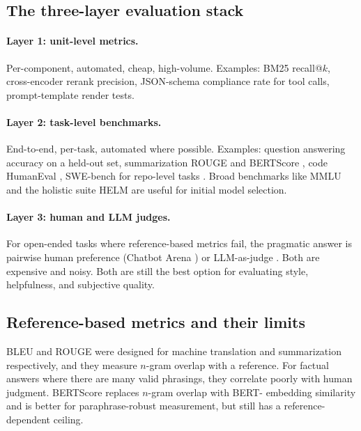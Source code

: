 \subsection{The three-layer evaluation stack}

\paragraph{Layer 1: unit-level metrics.} Per-component, automated,
cheap, high-volume. Examples: BM25 recall@$k$, cross-encoder
rerank precision, JSON-schema compliance rate for tool calls,
prompt-template render tests.

\paragraph{Layer 2: task-level benchmarks.} End-to-end, per-task,
automated where possible. Examples: question answering accuracy
on a held-out set, summarization ROUGE \citep{lin2004rouge} and
BERTScore \citep{zhang2020bertscore}, code HumanEval
\citep{chen2021humaneval}, SWE-bench for repo-level tasks
\citep{jimenez2024swebench}. Broad benchmarks like MMLU
\citep{hendrycks2021mmlu} and the holistic suite HELM
\citep{liang2023helm} are useful for initial model selection.

\paragraph{Layer 3: human and LLM judges.} For open-ended tasks
where reference-based metrics fail, the pragmatic answer is
pairwise human preference (Chatbot Arena
\citep{chiang2024arena}) or LLM-as-judge
\citep{zheng2023llmjudge}. Both are expensive and noisy. Both are
still the best option for evaluating style, helpfulness, and
subjective quality.

\subsection{Reference-based metrics and their limits}

BLEU \citep{papineni2002bleu} and ROUGE \citep{lin2004rouge} were
designed for machine translation and summarization respectively,
and they measure $n$-gram overlap with a reference. For factual
answers where there are many valid phrasings, they correlate
poorly with human judgment. BERTScore
\citep{zhang2020bertscore} replaces $n$-gram overlap with BERT-
embedding similarity and is better for paraphrase-robust
measurement, but still has a reference-dependent ceiling.

